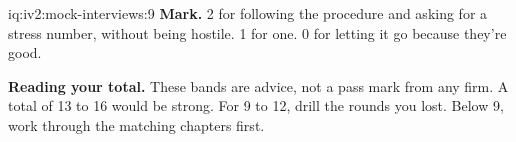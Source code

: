 \begin{solution}{iq:iv2:mock-interviews:9}
\textbf{Mark.} 2 for following the procedure and asking for a stress number, without being hostile. 1 for one. 0 for letting it go because they're good.

\medskip
\textbf{Reading your total.} These bands are advice, not a pass mark from any firm. A total of 13 to 16 would be strong. For 9 to 12, drill the rounds you lost. Below 9, work through the matching chapters first.

\end{solution}

